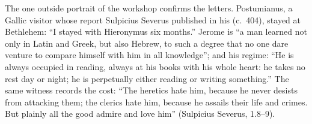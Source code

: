 The one outside portrait of the workshop confirms the letters. Postumianus, a
Gallic visitor whose report Sulpicius Severus published in his
 (c.~404), stayed at Bethlehem: ``I stayed with Hieronymus
six months.'' Jerome is ``a man learned not only in Latin and Greek, but also
Hebrew, to such a degree that no one dare venture to compare himself with him
in all knowledge''; and his regime: ``He is always occupied in reading,
always at his books with his whole heart: he takes no rest day or night; he
is perpetually either reading or writing something.'' The same witness
records the cost: ``The heretics hate him, because he never desists from
attacking them; the clerics hate him, because he assails their life and
crimes. But plainly all the good admire and love him'' (Sulpicius Severus,
 1.8--9).

